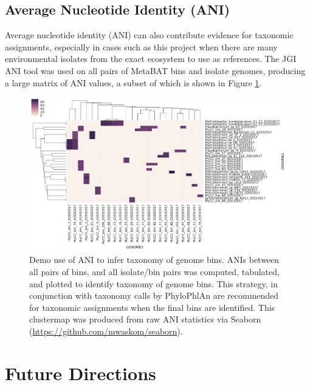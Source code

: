 \subsection{Average Nucleotide Identity (ANI)}

Average nucleotide identity (ANI) can also contribute evidence for taxonomic assignments, especially in cases such as this project when there are many environmental isolates from the exact ecosystem to use as references.
The JGI ANI tool was used on all pairs of MetaBAT bins and isolate genomes, producing a large matrix of ANI values, a subset of which is shown in Figure \ref{fig:ANIs}.

\begin{figure}[H]
\centering
    \includegraphics[width=1.0\textwidth]{./tex/chapter2/figures/170203_demo_of_ANI_heatmap.pdf}
    \begin{singlespace}
    \caption[Demo use of ANI to infer taxonomy of genome bins]{
        Demo use of ANI to infer taxonomy of genome bins.
        ANIs between all pairs of bins, and all isolate/bin pairs was computed, tabulated, and plotted to identify taxonomy of genome bins.
        This strategy, in conjunction with taxonomy calls by PhyloPhlAn \cite{segata2013} are recommended for taxonomic assignments when the final bins are identified.
        This clustermap was produced from raw ANI statistics via Seaborn (\url{https://github.com/mwaskom/seaborn}).}
    \label{fig:ANIs}
    \end{singlespace}
\end{figure}

\section{Future Directions}
\label{chA_future_steps}


